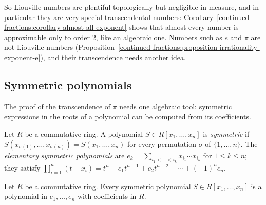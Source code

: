 So Liouville numbers are plentiful topologically but negligible in measure, and in particular they are very special transcendental numbers: Corollary~\ref{continued-fractions:corollary-almost-all-exponent}
shows that almost every number is approximable only to order $2$, like an algebraic one. Numbers such as $e$ and $\pi$ are not Liouville numbers
(Proposition~\ref{continued-fractions:proposition-irrationality-exponent-e}), and their transcendence needs another idea.

\subsection{Symmetric polynomials}\label{continued-fractions:subsection-symmetric}

The proof of the transcendence of $\pi$ needs one algebraic tool: symmetric expressions in the roots of a polynomial can be computed from its coefficients.

\begin{definition}\label{continued-fractions:definition-symmetric}
Let $R$ be a commutative ring. A polynomial $S \in R[x_1, \ldots, x_n]$ is \emph{symmetric} if $S(x_{\sigma(1)}, \ldots, x_{\sigma(n)}) = S(x_1, \ldots, x_n)$ for every permutation $\sigma$ of
$\{1, \ldots, n\}$. The \emph{elementary symmetric polynomials} are $e_k = \sum_{i_1 < \cdots < i_k}x_{i_1}\cdots x_{i_k}$ for $1 \leq k \leq n$; they satisfy
$\prod_{i=1}^n(t - x_i) = t^n - e_1t^{n-1} + e_2t^{n-2} - \cdots + (-1)^ne_n$.
\end{definition}

\begin{theorem}\label{continued-fractions:theorem-symmetric}
Let $R$ be a commutative ring. Every symmetric polynomial $S \in R[x_1, \ldots, x_n]$ is a polynomial in $e_1, \ldots, e_n$ with coefficients in $R$.
\end{theorem}

